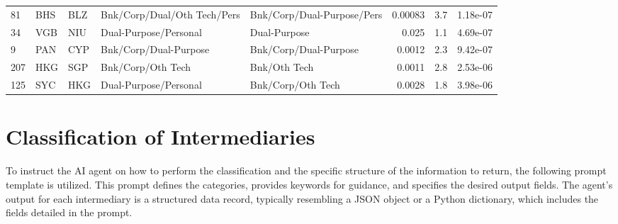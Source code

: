 {\begin{longtable}{@{}lllp{3cm}p{3cm}rrr@{}}
81  & BHS & BLZ & Bnk/Corp/Dual/Oth Tech/Pers & Bnk/Corp/Dual-Purpose/Pers  & 0.00083  & 3.7       & 1.18e-07  \\
34  & VGB & NIU & Dual-Purpose/Personal       & Dual-Purpose                & 0.025    & 1.1       & 4.69e-07  \\
9   & PAN & CYP & Bnk/Corp/Dual-Purpose       & Bnk/Corp/Dual-Purpose       & 0.0012   & 2.3       & 9.42e-07  \\
207 & HKG & SGP & Bnk/Corp/Oth Tech           & Bnk/Oth Tech                & 0.0011   & 2.8       & 2.53e-06  \\
125 & SYC & HKG & Dual-Purpose/Personal       & Bnk/Corp/Oth Tech           & 0.0028   & 1.8       & 3.98e-06  \\
\end{longtable}
} %
\clearpage


\section{Classification of Intermediaries}
\label{sec:appendix_intermediary_classification}

To instruct the AI agent on how to perform the classification and the specific structure of the information to return, the following prompt template is utilized. This prompt defines the categories, provides keywords for guidance, and specifies the desired output fields. The agent's output for each intermediary is a structured data record, typically resembling a JSON object or a Python dictionary, which includes the fields detailed in the prompt.

